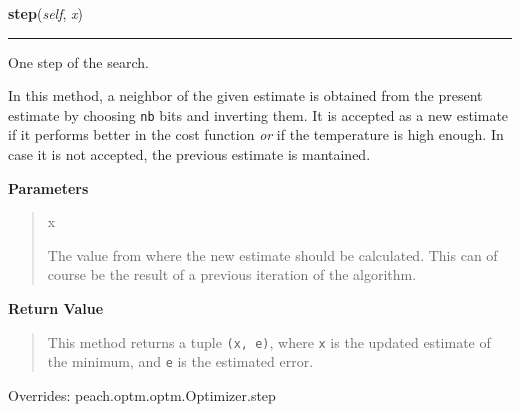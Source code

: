     \begin{boxedminipage}{\textwidth}

    \raggedright \textbf{step}(\textit{self}, \textit{x})

    \vspace{-1.5ex}

    \rule{\textwidth}{0.5\fboxrule}

One step of the search.

In this method, a neighbor of the given estimate is obtained from the
present estimate by choosing \texttt{nb} bits and inverting them. It is
accepted as a new estimate if it performs better in the cost function
\emph{or} if the temperature is high enough. In case it is not accepted, the
previous estimate is mantained.
    \vspace{1ex}

      \textbf{Parameters}
      \begin{quote}
        \begin{Ventry}{x}

          \item[x]


The value from where the new estimate should be calculated. This can
of course be the result of a previous iteration of the algorithm.
        \end{Ventry}

      \end{quote}

    \vspace{1ex}

      \textbf{Return Value}
      \begin{quote}

This method returns a tuple \texttt{(x, e)}, where \texttt{x} is the updated
estimate of the minimum, and \texttt{e} is the estimated error.
      \end{quote}

    \vspace{1ex}

      Overrides: peach.optm.optm.Optimizer.step

    \end{boxedminipage}

    \vspace{0.5ex}

